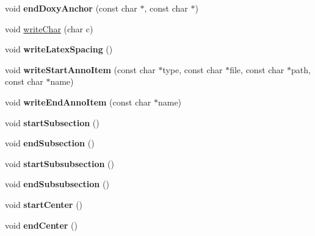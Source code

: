\begin{DoxyCompactItemize}
\item 
\mbox{\label{class_r_t_f_generator_a9498b4ab1e6143b700a3ee68e72c39a1}} 
void {\bfseries end\+Doxy\+Anchor} (const char $\ast$, const char $\ast$)
\item 
void \mbox{\hyperlink{class_r_t_f_generator_a1d1912d4a9d95b54ee88b12b3306e3d2}{write\+Char}} (char c)
\item 
\mbox{\label{class_r_t_f_generator_a1b58b1600ad492690fc1c83b7c6c9803}} 
void {\bfseries write\+Latex\+Spacing} ()
\item 
\mbox{\label{class_r_t_f_generator_a655778fe3ac63c361fa4a349b71a2cc6}} 
void {\bfseries write\+Start\+Anno\+Item} (const char $\ast$type, const char $\ast$file, const char $\ast$path, const char $\ast$name)
\item 
\mbox{\label{class_r_t_f_generator_ae39a707b688f116c4e5574b52091af49}} 
void {\bfseries write\+End\+Anno\+Item} (const char $\ast$name)
\item 
\mbox{\label{class_r_t_f_generator_aee4ce8432c14804a99c4422f97b8ae59}} 
void {\bfseries start\+Subsection} ()
\item 
\mbox{\label{class_r_t_f_generator_ae8b39bb99367d13410a574ef93cae773}} 
void {\bfseries end\+Subsection} ()
\item 
\mbox{\label{class_r_t_f_generator_a1b2ed71d67f00e2f067648714393341b}} 
void {\bfseries start\+Subsubsection} ()
\item 
\mbox{\label{class_r_t_f_generator_a15b343f2ae0d87433bfb28a92b02d502}} 
void {\bfseries end\+Subsubsection} ()
\item 
\mbox{\label{class_r_t_f_generator_aeaaadb26bd52241ae6a838608f30652b}} 
void {\bfseries start\+Center} ()
\item 
\mbox{\label{class_r_t_f_generator_ad5b630364443ea63a67af9166b9cbaad}} 
void {\bfseries end\+Center} ()
\item 

\end{DoxyCompactItemize}
